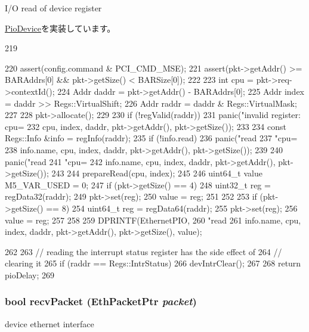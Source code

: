 I/O read of device register 

\hyperlink{classPioDevice_a842312590432036092c422c87a442358}{PioDevice}を実装しています。


\begin{DoxyCode}
219 {
220     assert(config.command & PCI_CMD_MSE);
221     assert(pkt->getAddr() >= BARAddrs[0] && pkt->getSize() < BARSize[0]);
222 
223     int cpu = pkt->req->contextId();
224     Addr daddr = pkt->getAddr() - BARAddrs[0];
225     Addr index = daddr >> Regs::VirtualShift;
226     Addr raddr = daddr & Regs::VirtualMask;
227 
228     pkt->allocate();
229 
230     if (!regValid(raddr))
231         panic("invalid register: cpu=%
232               cpu, index, daddr, pkt->getAddr(), pkt->getSize());
233 
234     const Regs::Info &info = regInfo(raddr);
235     if (!info.read)
236         panic("read %
237               "cpu=%
238               info.name, cpu, index, daddr, pkt->getAddr(), pkt->getSize());
239 
240         panic("read %
241               "cpu=%
242               info.name, cpu, index, daddr, pkt->getAddr(), pkt->getSize());
243 
244     prepareRead(cpu, index);
245 
246     uint64_t value M5_VAR_USED = 0;
247     if (pkt->getSize() == 4) {
248         uint32_t reg = regData32(raddr);
249         pkt->set(reg);
250         value = reg;
251     }
252 
253     if (pkt->getSize() == 8) {
254         uint64_t reg = regData64(raddr);
255         pkt->set(reg);
256         value = reg;
257     }
258 
259     DPRINTF(EthernetPIO,
260             "read %
261             info.name, cpu, index, daddr, pkt->getAddr(), pkt->getSize(), value);
      
262 
263     // reading the interrupt status register has the side effect of
264     // clearing it
265     if (raddr == Regs::IntrStatus)
266         devIntrClear();
267 
268     return pioDelay;
269 }
\end{DoxyCode}
\hypertarget{classSinic_1_1Device_ad54e71348f53dfb5444979e9bfaf3164}{
\subsubsection[{recvPacket}]{\setlength{\rightskip}{0pt plus 5cm}bool recvPacket ({\bf EthPacketPtr} {\em packet})}}
\label{classSinic_1_1Device_ad54e71348f53dfb5444979e9bfaf3164}
device ethernet interface 


